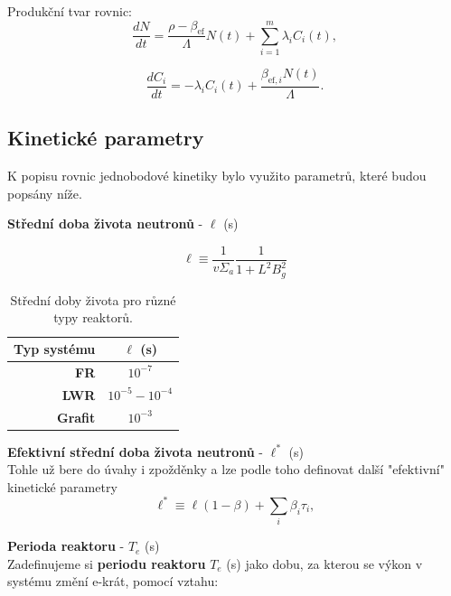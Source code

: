 Produkční tvar rovnic:
\begin{equation}
  \boxed{
  \dfrac{dN}{dt} = \dfrac{\rho - \beta_{\text{ef}}}{\Lambda} N(t) + \sum_{i=1}^m \lambda_i C_i(t),
  \label{rovnice_kinetiky_zpozdenky_3}}
\end{equation}

\begin{equation}
  \boxed{
  \dfrac{dC_i}{dt} = -\lambda_i C_i(t) + \dfrac{\beta_{\text{ef},i}  N(t)}{\Lambda}.
  \label{rovnice_kinetiky_zpozdenky_4}}
\end{equation}

\subsection{Kinetické parametry}
K popisu rovnic jednobodové kinetiky bylo využito parametrů, které budou popsány níže.

\textbf{Střední doba života neutronů} -  $\ell$ (s)

\begin{equation}
  \boxed{
  \ell \equiv \dfrac{1}{v \Sigma_a} \dfrac{1}{1+L^2B_g^2}
  \label{stredni_doba_zivota}}
\end{equation}

\begin{table}[H]
\small
\centering
\caption{\small Střední doby života pro různé typy reaktorů.}
\label{table_stredni_doby_zivota}
\begin{tabular}{@{}rc@{}}
\toprule
\textbf{Typ systému} & $\ell$ (s)           \\ \midrule
\textbf{FR}          & $10^{-7}$            \\
\textbf{LWR}         & $10^{-5} - 10^{-4}$  \\
\textbf{Grafit}      & $10^{-3}$            \\ \bottomrule
\end{tabular}
\end{table}

\textbf{Efektivní střední doba života neutronů} -  $\ell^*$ (s) \\
Tohle už bere do úvahy i zpožděnky a lze podle toho definovat další "efektivní" kinetické parametry
\begin{equation}
  \boxed{
  \ell^* \equiv \ell(1-\beta) + \sum_i \beta_i \tau_i,
  \label{efektivni_stredni_doba_zivota}}
\end{equation}

\textbf{Perioda reaktoru} - $T_e$ (s) \\
Zadefinujeme si \textbf{periodu reaktoru} $T_e$ (s) jako dobu, za kterou se výkon v systému změní e-krát, pomocí vztahu:

